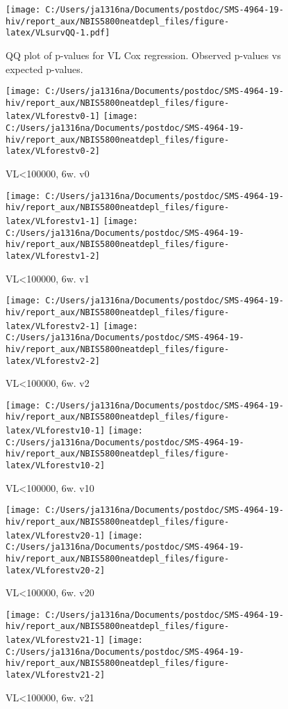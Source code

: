 \documentclass[
]{article}
\begin{document}
\begin{figure}
\centering
\texttt{[image: C:/Users/ja1316na/Documents/postdoc/SMS-4964-19-hiv/report\_aux/NBIS5800neatdepl\_files/figure-latex/VLsurvQQ-1.pdf]}
\caption{\label{fig:VLsurvQQ}QQ plot of p-values for VL Cox regression. Observed p-values vs expected p-values.}
\end{figure}

\begin{figure}
\texttt{[image: C:/Users/ja1316na/Documents/postdoc/SMS-4964-19-hiv/report\_aux/NBIS5800neatdepl\_files/figure-latex/VLforestv0-1]} \texttt{[image: C:/Users/ja1316na/Documents/postdoc/SMS-4964-19-hiv/report\_aux/NBIS5800neatdepl\_files/figure-latex/VLforestv0-2]} \caption{VL<100000, 6w. v0}\label{fig:VLforestv0}
\end{figure}

\begin{figure}
\texttt{[image: C:/Users/ja1316na/Documents/postdoc/SMS-4964-19-hiv/report\_aux/NBIS5800neatdepl\_files/figure-latex/VLforestv1-1]} \texttt{[image: C:/Users/ja1316na/Documents/postdoc/SMS-4964-19-hiv/report\_aux/NBIS5800neatdepl\_files/figure-latex/VLforestv1-2]} \caption{VL<100000, 6w. v1}\label{fig:VLforestv1}
\end{figure}

\begin{figure}
\texttt{[image: C:/Users/ja1316na/Documents/postdoc/SMS-4964-19-hiv/report\_aux/NBIS5800neatdepl\_files/figure-latex/VLforestv2-1]} \texttt{[image: C:/Users/ja1316na/Documents/postdoc/SMS-4964-19-hiv/report\_aux/NBIS5800neatdepl\_files/figure-latex/VLforestv2-2]} \caption{VL<100000, 6w. v2}\label{fig:VLforestv2}
\end{figure}
\begin{figure}
\texttt{[image: C:/Users/ja1316na/Documents/postdoc/SMS-4964-19-hiv/report\_aux/NBIS5800neatdepl\_files/figure-latex/VLforestv10-1]} \texttt{[image: C:/Users/ja1316na/Documents/postdoc/SMS-4964-19-hiv/report\_aux/NBIS5800neatdepl\_files/figure-latex/VLforestv10-2]} \caption{VL<100000, 6w. v10}\label{fig:VLforestv10}
\end{figure}

\begin{figure}
\texttt{[image: C:/Users/ja1316na/Documents/postdoc/SMS-4964-19-hiv/report\_aux/NBIS5800neatdepl\_files/figure-latex/VLforestv20-1]} \texttt{[image: C:/Users/ja1316na/Documents/postdoc/SMS-4964-19-hiv/report\_aux/NBIS5800neatdepl\_files/figure-latex/VLforestv20-2]} \caption{VL<100000, 6w. v20}\label{fig:VLforestv20}
\end{figure}
\begin{figure}
\texttt{[image: C:/Users/ja1316na/Documents/postdoc/SMS-4964-19-hiv/report\_aux/NBIS5800neatdepl\_files/figure-latex/VLforestv21-1]} \texttt{[image: C:/Users/ja1316na/Documents/postdoc/SMS-4964-19-hiv/report\_aux/NBIS5800neatdepl\_files/figure-latex/VLforestv21-2]} \caption{VL<100000, 6w. v21}\label{fig:VLforestv21}
\end{figure}
\end{document}
